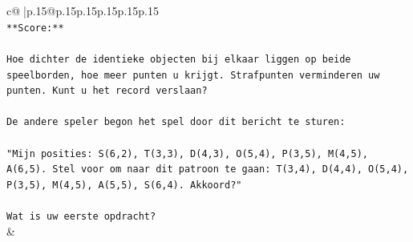 \documentclass{article}
\begin{document}
{\begin{supertabular}{c@{$\;$}|p{.15\linewidth}@{}p{.15\linewidth}p{.15\linewidth}p{.15\linewidth}p{.15\linewidth}p{.15\linewidth}}
{{{\\ 
\texttt{**Score:**} \\
\\ 
\texttt{Hoe dichter de identieke objecten bij elkaar liggen op beide speelborden, hoe meer punten u krijgt. Strafpunten verminderen uw punten. Kunt u het record verslaan?} \\
\\ 
\texttt{De andere speler begon het spel door dit bericht te sturen:} \\
\\ 
\texttt{"Mijn posities: S(6,2), T(3,3), D(4,3), O(5,4), P(3,5), M(4,5), A(6,5). Stel voor om naar dit patroon te gaan: T(3,4), D(4,4), O(5,4), P(3,5), M(4,5), A(5,5), S(6,4). Akkoord?"} \\
\\ 
\texttt{Wat is uw eerste opdracht?} \\
            }
        }
    }
    & \\ \\


\end{supertabular}}
\end{document}
